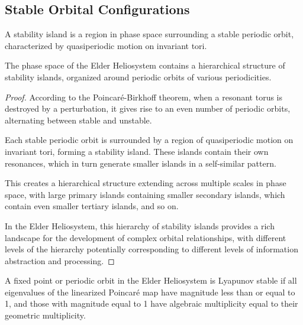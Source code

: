 \subsection{Stable Orbital Configurations}

\begin{definition}
A stability island is a region in phase space surrounding a stable periodic orbit, characterized by quasiperiodic motion on invariant tori.
\end{definition}

\begin{theorem}
The phase space of the Elder Heliosystem contains a hierarchical structure of stability islands, organized around periodic orbits of various periodicities.
\end{theorem}

\begin{proof}
According to the Poincaré-Birkhoff theorem, when a resonant torus is destroyed by a perturbation, it gives rise to an even number of periodic orbits, alternating between stable and unstable.

Each stable periodic orbit is surrounded by a region of quasiperiodic motion on invariant tori, forming a stability island. These islands contain their own resonances, which in turn generate smaller islands in a self-similar pattern.

This creates a hierarchical structure extending across multiple scales in phase space, with large primary islands containing smaller secondary islands, which contain even smaller tertiary islands, and so on.

In the Elder Heliosystem, this hierarchy of stability islands provides a rich landscape for the development of complex orbital relationships, with different levels of the hierarchy potentially corresponding to different levels of information abstraction and processing.
\end{proof}

\begin{theorem}
A fixed point or periodic orbit in the Elder Heliosystem is Lyapunov stable if all eigenvalues of the linearized Poincaré map have magnitude less than or equal to 1, and those with magnitude equal to 1 have algebraic multiplicity equal to their geometric multiplicity.
\end{theorem}

